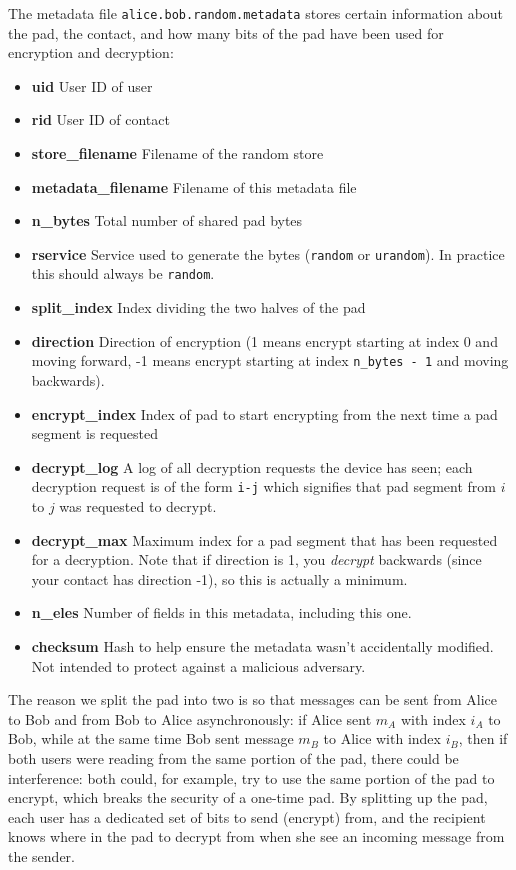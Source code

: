 \documentclass[twocolumn]{article}
\begin{document}
The metadata file \texttt{alice.bob.random.metadata} stores certain information about the pad, the contact, and how many bits of the pad have been used for encryption and decryption:

\begin{itemize} \itemsep0em 
  \item[] \textbf{uid} User ID of user
  \item[] \textbf{rid} User ID of contact
  \item[] \textbf{store\_filename} Filename of the random store
  \item[] \textbf{metadata\_filename} Filename of this metadata file
  \item[] \textbf{n\_bytes} Total number of shared pad bytes
  \item[] \textbf{rservice} Service used to generate the bytes (\texttt{random} or \texttt{urandom}). In practice this should always be \texttt{random}.
  \item[] \textbf{split\_index} Index dividing the two halves of the pad
  \item[] \textbf{direction} Direction of encryption (1 means encrypt starting at index 0 and moving forward, -1 means encrypt starting at index \texttt{n\_bytes - 1} and moving backwards).
  \item[] \textbf{encrypt\_index} Index of pad to start encrypting from the next time a pad segment is requested
  \item[] \textbf{decrypt\_log} A log of all decryption requests the device has seen; each decryption request is of the form \texttt{i-j} which signifies that pad segment from $i$ to $j$ was requested to decrypt.
  \item[] \textbf{decrypt\_max} Maximum index for a pad segment that has been requested for a decryption. Note that if direction is 1, you \emph{decrypt} backwards (since your contact has direction -1), so this is actually a minimum.
  \item[] \textbf{n\_eles} Number of fields in this metadata, including this one.
  \item[] \textbf{checksum} Hash to help ensure the metadata wasn't accidentally modified. Not intended to protect against a malicious adversary.
\end{itemize}

The reason we split the pad into two is so that messages can be sent from Alice to Bob and from Bob to Alice asynchronously: if Alice sent $m_A$ with index $i_A$ to Bob, while at the same time Bob sent message $m_B$ to Alice with index $i_B$, then if both users were reading from the same portion of the pad, there could be interference: both could, for example, try to use the same portion of the pad to encrypt, which breaks the security of a one-time pad. By splitting up the pad, each user has a dedicated set of bits to send (encrypt) from, and the recipient knows where in the pad to decrypt from when she see an incoming message from the sender.
\end{document}
